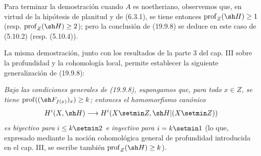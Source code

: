 Para terminar la demostración cuando $A$ es noetheriano, observemos que, en
virtud de la hipótesis de planitud y de (6.3.1), se tiene entonces
$\operatorname{prof}_Z(\sh H)\geq1$
(resp. $\operatorname{prof}_Z(\sh H)\geq2$); pero la conclusión de (19.9.8)
se deduce en este caso de (5.10.2) (resp. (5.10.4)).

\begin{remark}[19.9.9]
\label{IV.19.9.9}
La misma demostración, junto con los resultados de la parte 3 del cap. III
sobre la profundidad y la cohomología local, permite establecer la siguiente
generalización de (19.9.8):

\emph{Bajo las condiciones generales de \textup{(19.9.8)}, supongamos que, para todo
$x\in Z$, se tiene $\operatorname{prof}((\sh F_{f(x)})_x)\geq k$; entonces el
homomorfismo canónico}
\[
  H^i(X,\sh H)\longrightarrow H^i(X\setmin Z,\sh H|(X\setmin Z))
\]
\emph{es biyectivo para $i\leq k\setmin 2$ e inyectivo para $i=k\setmin 1$} (lo que,
expresado mediante la noción cohomológica general de profundidad introducida
en el cap. III, se escribe también
$\operatorname{prof}_Z(\sh H)\geq k$).
\end{remark}
